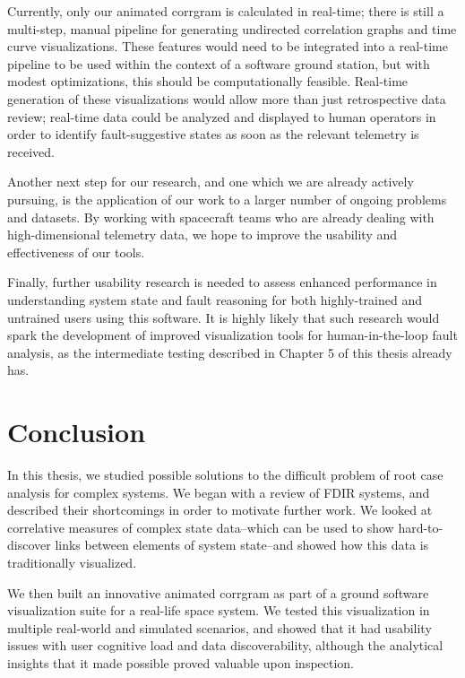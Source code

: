 Currently, only our animated corrgram is calculated in real-time; there is still a multi-step, manual pipeline for generating undirected correlation graphs and time curve visualizations. These features would need to be integrated into a real-time pipeline to be used within the context of a software ground station, but with modest optimizations, this should be computationally feasible. Real-time generation of these visualizations would allow more than just retrospective data review; real-time data could be analyzed and displayed to human operators in order to identify fault-suggestive states as soon as the relevant telemetry is received.

Another next step for our research, and one which we are already actively pursuing, is the application of our work to a larger number of ongoing problems and datasets. By working with spacecraft teams who are already dealing with high-dimensional telemetry data, we hope to improve the usability and effectiveness of our tools.

Finally, further usability research is needed to assess enhanced performance in understanding system state and fault reasoning for both highly-trained and untrained users using this software. It is highly likely that such research would spark the development of improved visualization tools for human-in-the-loop fault analysis, as the intermediate testing described in Chapter 5 of this thesis already has.

\section{Conclusion}

In this thesis, we studied possible solutions to the difficult problem of root case analysis for complex systems. We began with a review of FDIR systems, and described their shortcomings in order to motivate further work. We looked at correlative measures of complex state data--which can be used to show hard-to-discover links between elements of system state--and showed how this data is traditionally visualized.

We then built an innovative animated corrgram as part of a ground software visualization suite for a real-life space system. We tested this visualization in multiple real-world and simulated scenarios, and showed that it had usability issues with user cognitive load and data discoverability, although the analytical insights that it made possible proved valuable upon inspection.

